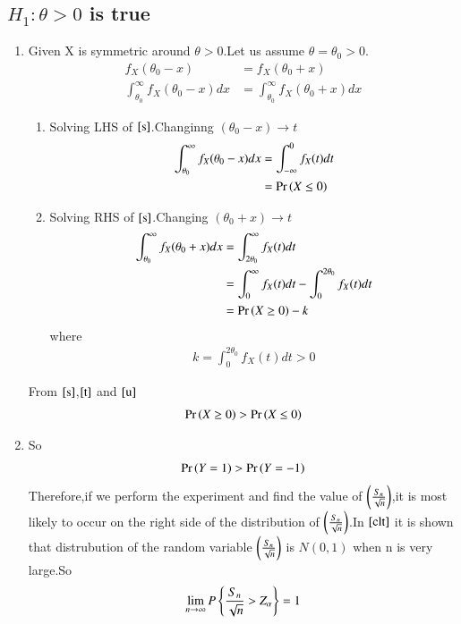 \documentclass[journal,12pt,twocolumn]{IEEEtran}
\begin{document}
\subsection{$H_1:\theta >0$ is true}
\begin{enumerate}
    \item Given X is symmetric around $\theta>0$.Let us assume $\theta=\theta_0>0$.
    \begin{align}
        f_X(\theta_0-x)&=f_X(\theta_0+x)\\
        \int_{\theta_0}^{\infty} f_X(\theta_0-x)dx&=
        \int_{\theta_0}^{\infty} f_X(\theta_0+x)dx
        \label{s}
    \end{align}
    \begin{enumerate}
        \item Solving LHS of $\eqref{s}$.Changinng $(\theta_0-x) \rightarrow t$
        \begin{align}
           \int_{\theta_0}^{\infty} f_X(\theta_0-x)dx&=
           \int_{-\infty}^{0}f_X(t) dt\\
           &=\Pr\left(X\leq0\right)\label{t}
        \end{align}
        \item Solving RHS of $\eqref{s}$.Changing $(\theta_0+x) \rightarrow t$
        \begin{align}
           \int_{\theta_0}^{\infty} f_X(\theta_0+x)dx&=
           \int_{2\theta_0}^{\infty} f_X(t)dt\\
          &= \int_{0}^{\infty} f_X(t)dt-\int_{0}^{2\theta_0} f_X(t)dt\\
          &=\Pr\left(X\geq0\right)-k\label{u}
        \end{align}
        where
        \begin{align}
           k=\int_{0}^{2\theta_0} f_X(t)dt>0 
        \end{align}
    \end{enumerate}
    From $\eqref{s}$,$\eqref{t}$ and $\eqref{u}$
    \begin{align}
        \Pr\left(X\geq0\right)>\Pr\left(X\leq0\right)
    \end{align}
    \item So
    \begin{align}
        \Pr\left(Y=1\right)>\Pr\left(Y=-1\right)
    \end{align}
    Therefore,if we perform the experiment and find the value of $\left(\frac{S_n}{\sqrt{n}}\right)$,it is most likely to occur on the right side of the distribution of 
$\left(\frac{S_n}{\sqrt{n}}\right)$.In $\eqref{clt}$ it is shown that distrubution of the random variable $\left(\frac{S_n}{\sqrt{n}}\right)$
 is $N(0,1)$ when n is very large.So
\begin{align}
    \lim_{n\to\infty}P\left\{\frac{S_n}{\sqrt{n}}>Z_\alpha\right\}=1
\end{align}
\end{enumerate}
\end{document}
